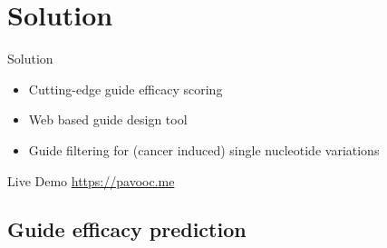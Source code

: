 \documentclass[Nike]{tuberlinbeamer}
\begin{document}
\section{Solution}


\begin{frame}{Solution}
  \begin{itemize}
    \vspace{0.2cm}
    \item Cutting-edge guide efficacy scoring
      \pause
    \vspace{0.2cm}
    \item Web based guide design tool
      \pause
    \vspace{0.2cm}
    \item Guide filtering for (cancer induced) single nucleotide variations
  \end{itemize}
\end{frame}

\begin{frame}{Live Demo}
  \url{https://pavooc.me}
\end{frame}

\subsection{Guide efficacy prediction}
\end{document}
